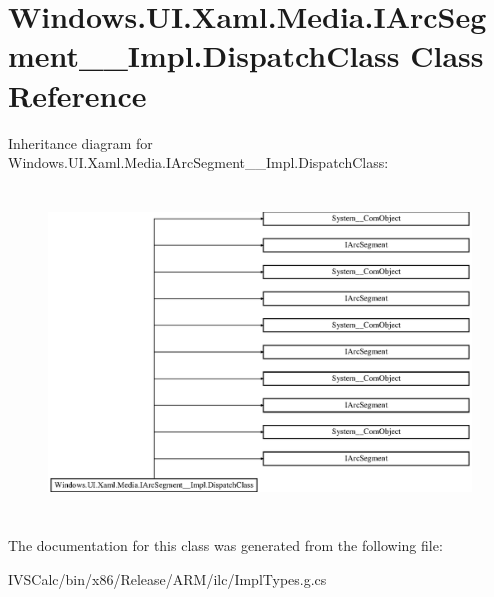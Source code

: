 \hypertarget{class_windows_1_1_u_i_1_1_xaml_1_1_media_1_1_i_arc_segment_____impl_1_1_dispatch_class}{}\section{Windows.\+U\+I.\+Xaml.\+Media.\+I\+Arc\+Segment\+\_\+\+\_\+\+Impl.\+Dispatch\+Class Class Reference}
\label{class_windows_1_1_u_i_1_1_xaml_1_1_media_1_1_i_arc_segment_____impl_1_1_dispatch_class}
Inheritance diagram for Windows.\+U\+I.\+Xaml.\+Media.\+I\+Arc\+Segment\+\_\+\+\_\+\+Impl.\+Dispatch\+Class\+:\begin{figure}[H]
\begin{center}
\leavevmode
\includegraphics[height=8.750000cm]{class_windows_1_1_u_i_1_1_xaml_1_1_media_1_1_i_arc_segment_____impl_1_1_dispatch_class}
\end{center}
\end{figure}


The documentation for this class was generated from the following file\+:\begin{DoxyCompactItemize}
\item 
I\+V\+S\+Calc/bin/x86/\+Release/\+A\+R\+M/ilc/Impl\+Types.\+g.\+cs\end{DoxyCompactItemize}
